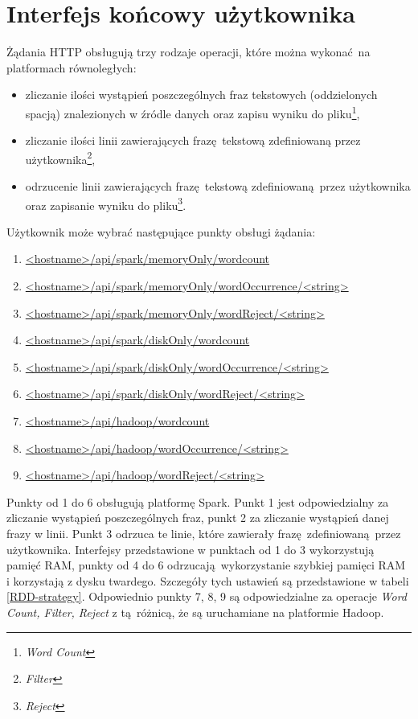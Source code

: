 \section{Interfejs końcowy użytkownika}\label{sec:user_interfaces}
Żądania HTTP obsługują trzy rodzaje operacji, które można wykonać na platformach równoległych:
\begin{itemize}\label{e2e_operations}
	\item {zliczanie ilości wystąpień poszczególnych fraz tekstowych (oddzielonych spacją) znalezionych w źródle danych oraz zapisu wyniku do pliku}\footnote{\textit{Word Count}},
	\item {zliczanie ilości linii zawierających frazę tekstową zdefiniowaną przez użytkownika}\footnote{\textit{Filter}},
	\item {odrzucenie linii zawierających frazę tekstową zdefiniowaną przez użytkownika oraz zapisanie wyniku do pliku}\footnote{\textit{Reject}}.
\end{itemize}
Użytkownik może wybrać następujące punkty obsługi żądania:
\begin{enumerate}
	\item{\url{<hostname>/api/spark/memoryOnly/wordcount}}
	\item{\url{<hostname>/api/spark/memoryOnly/wordOccurrence/<string> }}
	\item{\url{<hostname>/api/spark/memoryOnly/wordReject/<string> }}
	\item{\url{<hostname>/api/spark/diskOnly/wordcount}}
	\item{\url{<hostname>/api/spark/diskOnly/wordOccurrence/<string> }}
	\item{\url{<hostname>/api/spark/diskOnly/wordReject/<string> }}
	\item{\url{<hostname>/api/hadoop/wordcount}}
	\item{\url{<hostname>/api/hadoop/wordOccurrence/<string>}}
	\item{\url{<hostname>/api/hadoop/wordReject/<string> }}
\end{enumerate}
Punkty od 1 do 6 obsługują platformę Spark. Punkt 1 jest odpowiedzialny za zliczanie wystąpień poszczególnych fraz, punkt 2 za zliczanie wystąpień danej frazy w linii. Punkt 3 odrzuca te linie, które zawierały frazę zdefiniowaną przez użytkownika. Interfejsy przedstawione w punktach od 1 do 3 wykorzystują pamięć RAM, punkty od 4 do 6 odrzucają wykorzystanie szybkiej pamięci RAM i korzystają z dysku twardego. Szczegóły tych ustawień są przedstawione w tabeli \ref{RDD-strategy}. Odpowiednio punkty 7, 8, 9 są odpowiedzialne za operacje \textit{Word Count, Filter, Reject} z tą różnicą, że są uruchamiane na platformie Hadoop.  

